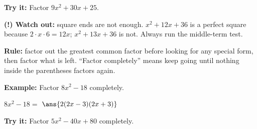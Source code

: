 \documentclass[12pt]{article}
\begin{document}
\begin{tryitbox}
\textbf{Try it:} \quad Factor $9x^2 + 30x + 25$.\\[2pt]
\end{tryitbox}

\begin{watchoutbox}
\textbf{(!) Watch out:} square ends are not enough. $x^2 + 12x + 36$ is a perfect square because $2 \cdot x \cdot 6 = 12x$; $x^2 + 13x + 36$ is not. Always run the middle-term test.
\end{watchoutbox}


\begin{formulabox}
\textbf{Rule:} \quad factor out the greatest common factor before looking for any special form, then factor what is left. ``Factor completely'' means keep going until nothing inside the parentheses factors again.
\end{formulabox}

\begin{examplebox}
\textbf{Example:} \quad Factor $8x^2 - 18$ completely.
\par
$8x^2 - 18 = $ $\ans{2(2x-3)(2x+3)}$
\end{examplebox}

\begin{tryitbox}
\textbf{Try it:} \quad Factor $5x^2 - 40x + 80$ completely.\\[2pt]
\end{tryitbox}
\end{document}
